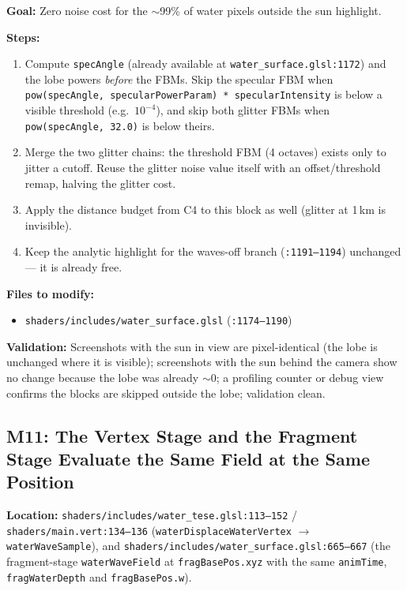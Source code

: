 \documentclass[11pt,a4paper]{article}
\begin{document}
\begin{tcolorbox}[promptbox={Prompt: Gate the Specular/Glitter Noise on the Highlight Lobe}]
\textbf{Goal:} Zero noise cost for the $\sim$99\% of water pixels outside the sun highlight.

\textbf{Steps:}
\begin{enumerate}
    \item Compute \texttt{specAngle} (already available at \texttt{water\_surface.glsl:1172}) and the lobe powers
    \emph{before} the FBMs. Skip the specular FBM when \texttt{pow(specAngle, specularPowerParam) * specularIntensity}
    is below a visible threshold (e.g.\ $10^{-4}$), and skip both glitter FBMs when \texttt{pow(specAngle, 32.0)} is
    below theirs.
    \item Merge the two glitter chains: the threshold FBM (4 octaves) exists only to jitter a cutoff. Reuse the glitter
    noise value itself with an offset/threshold remap, halving the glitter cost.
    \item Apply the distance budget from C4 to this block as well (glitter at 1\,km is invisible).
    \item Keep the analytic highlight for the waves-off branch (\texttt{:1191--1194}) unchanged --- it is already free.
\end{enumerate}

\textbf{Files to modify:}
\begin{itemize}
    \item \texttt{shaders/includes/water\_surface.glsl} (\texttt{:1174--1190})
\end{itemize}

\textbf{Validation:} Screenshots with the sun in view are pixel-identical (the lobe is unchanged where it is visible);
screenshots with the sun behind the camera show no change because the lobe was already $\sim$0; a profiling counter or
debug view confirms the blocks are skipped outside the lobe; validation clean.
\end{tcolorbox}

\subsection{M11: The Vertex Stage and the Fragment Stage Evaluate the Same Field at the Same Position}

\textbf{Location:} \texttt{shaders/includes/water\_tese.glsl:113--152} / \texttt{shaders/main.vert:134--136}
(\texttt{waterDisplaceWaterVertex} $\rightarrow$ \texttt{waterWaveSample}), and
\texttt{shaders/includes/water\_surface.glsl:665--667} (the fragment-stage \texttt{waterWaveField} at
\texttt{fragBasePos.xyz} with the same \texttt{animTime}, \texttt{fragWaterDepth} and \texttt{fragBasePos.w}).
\end{document}

